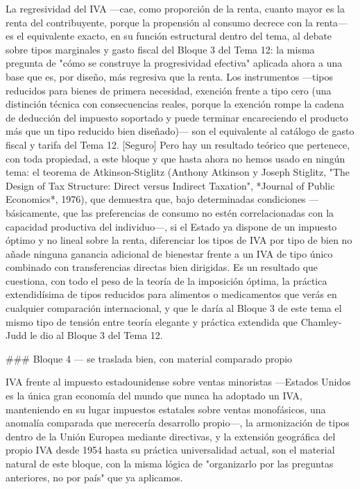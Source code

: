 \documentclass[10pt,a4paper]{article}
\begin{document}
La regresividad del IVA —cae, como proporción de la renta, cuanto mayor es la renta del contribuyente, porque la propensión al consumo decrece con la renta— es el equivalente exacto, en su función estructural dentro del tema, al debate sobre tipos marginales y gasto fiscal del Bloque 3 del Tema 12: la misma pregunta de "cómo se construye la progresividad efectiva" aplicada ahora a una base que es, por diseño, más regresiva que la renta. Los instrumentos —tipos reducidos para bienes de primera necesidad, exención frente a tipo cero (una distinción técnica con consecuencias reales, porque la exención rompe la cadena de deducción del impuesto soportado y puede terminar encareciendo el producto más que un tipo reducido bien diseñado)— son el equivalente al catálogo de gasto fiscal y tarifa del Tema 12. [Seguro] Pero hay un resultado teórico que pertenece, con toda propiedad, a este bloque y que hasta ahora no hemos usado en ningún tema: el teorema de Atkinson-Stiglitz (Anthony Atkinson y Joseph Stiglitz, "The Design of Tax Structure: Direct versus Indirect Taxation", *Journal of Public Economics*, 1976), que demuestra que, bajo determinadas condiciones —básicamente, que las preferencias de consumo no estén correlacionadas con la capacidad productiva del individuo—, si el Estado ya dispone de un impuesto óptimo y no lineal sobre la renta, diferenciar los tipos de IVA por tipo de bien no añade ninguna ganancia adicional de bienestar frente a un IVA de tipo único combinado con transferencias directas bien dirigidas. Es un resultado que cuestiona, con todo el peso de la teoría de la imposición óptima, la práctica extendidísima de tipos reducidos para alimentos o medicamentos que verás en cualquier comparación internacional, y que le daría al Bloque 3 de este tema el mismo tipo de tensión entre teoría elegante y práctica extendida que Chamley-Judd le dio al Bloque 3 del Tema 12.

### Bloque 4 — se traslada bien, con material comparado propio

IVA frente al impuesto estadounidense sobre ventas minoristas —Estados Unidos es la única gran economía del mundo que nunca ha adoptado un IVA, manteniendo en su lugar impuestos estatales sobre ventas monofásicos, una anomalía comparada que merecería desarrollo propio—, la armonización de tipos dentro de la Unión Europea mediante directivas, y la extensión geográfica del propio IVA desde 1954 hasta su práctica universalidad actual, son el material natural de este bloque, con la misma lógica de "organizarlo por las preguntas anteriores, no por país" que ya aplicamos.
\end{document}
